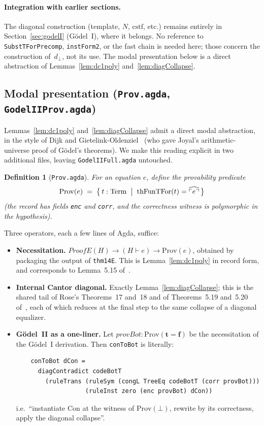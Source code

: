 \documentclass[11pt]{article}
\newtheorem{definition}[theorem]{Definition}
\newcommand{\trueT}{\mathbf{t}}
\newcommand{\falseT}{\mathbf{f}}
\newcommand{\code}[1]{\ulcorner #1 \urcorner}
\newcommand{\reify}[1]{\widehat{#1}}
\newcommand{\thFunTFor}{\mathrm{thFunTFor}}
\begin{document}
\paragraph{Integration with earlier sections.}
The diagonal construction (template, $N$, $\mathrm{cstf}$, etc.)
remains entirely in Section~\ref{sec:godelI} (G\"odel~I), where it
belongs.  No reference to \texttt{SubstTForPrecomp},
\texttt{instForm2}, or the fast chain is needed here; those
concern the construction of~$d_\bot$, not its use.  The modal
presentation below is a direct abstraction of
Lemmas~\ref{lem:dc1poly} and~\ref{lem:diagCollapse}.

\subsection{Modal presentation (\texttt{Prov.agda}, \texttt{GodelIIProv.agda})}

Lemmas~\ref{lem:dc1poly} and~\ref{lem:diagCollapse} admit a
direct modal abstraction, in the style of Dijk and
Gietelink-Oldenziel~\cite{dijk2020} (who gave Joyal's
arithmetic-universe proof of G\"odel's theorems).  We make this
reading explicit in two additional files, leaving
\texttt{GodelIIFull.agda} untouched.

\begin{definition}[\texttt{Prov.agda}]
For an equation $e$, define the provability predicate
\[
  \mathrm{Prov}(e) \;=\; \bigl\{\, t : \mathrm{Term}
    \;\bigm|\; \thFunTFor(t) = \reify{\code{e}} \,\bigr\}
\]
(the record has fields \texttt{enc} and \texttt{corr}, and the
correctness witness is polymorphic in the hypothesis).
\end{definition}

\noindent
Three operators, each a few lines of Agda, suffice:
\begin{itemize}
\item \textbf{Necessitation.}
  $\mathit{ProofE}(H) \to (H \vdash e) \to \mathrm{Prov}(e)$,
  obtained by packaging the output of \texttt{thm14E}.  This is
  Lemma~\ref{lem:dc1poly} in record form, and corresponds to
  Lemma~5.15 of~\cite{dijk2020}.
\item \textbf{Internal Cantor diagonal.}
  Exactly Lemma~\ref{lem:diagCollapse}; this is the shared tail
  of Rose's Theorems~17 and~18 and of Theorems~5.19 and~5.20
  of~\cite{dijk2020}, each of which reduces at the final step to
  the same collapse of a diagonal equalizer.
\item \textbf{G\"odel~II as a one-liner.}  Let
  $\mathit{provBot} : \mathrm{Prov}(\trueT = \falseT)$ be the
  necessitation of the G\"odel~I derivation.  Then
  \texttt{conToBot} is literally:
\begin{verbatim}
    conToBot dCon =
      diagContradict codeBotT
        (ruleTrans (ruleSym (congL TreeEq codeBotT (corr provBot)))
                   (ruleInst zero (enc provBot) dCon))
\end{verbatim}
  i.e.\ ``instantiate $\mathrm{Con}$ at the witness of
  $\mathrm{Prov}(\bot)$, rewrite by its correctness, apply the
  diagonal collapse''.
\end{itemize}
\end{document}
